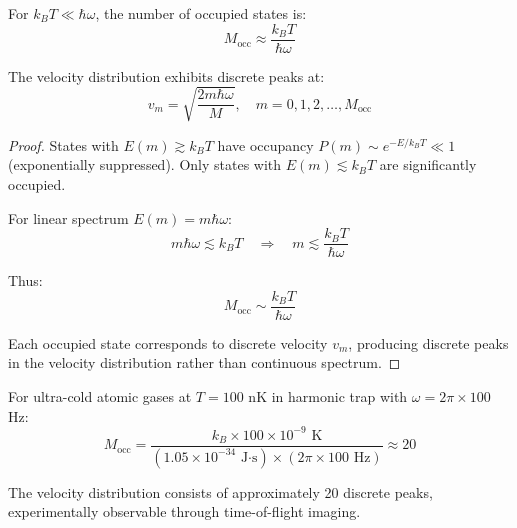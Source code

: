 \begin{definition}
\begin{proposition}
\label{prop:low_temp_quantization}
For $k_BT \ll \hbar\omega$, the number of occupied states is:
\begin{equation}
M_{\text{occ}} \approx \frac{k_BT}{\hbar\omega}
\end{equation}

The velocity distribution exhibits discrete peaks at:
\begin{equation}
v_m = \sqrt{\frac{2m\hbar\omega}{M}}, \quad m = 0, 1, 2, \ldots, M_{\text{occ}}
\end{equation}
\end{proposition}

\begin{proof}
States with $E(m) \gtrsim k_BT$ have occupancy $P(m) \sim e^{-E/k_BT} \ll 1$ (exponentially suppressed). Only states with $E(m) \lesssim k_BT$ are significantly occupied.

For linear spectrum $E(m) = m\hbar\omega$:
\begin{equation}
m\hbar\omega \lesssim k_BT \quad \Rightarrow \quad m \lesssim \frac{k_BT}{\hbar\omega}
\end{equation}

Thus:
\begin{equation}
M_{\text{occ}} \sim \frac{k_BT}{\hbar\omega}
\end{equation}

Each occupied state corresponds to discrete velocity $v_m$, producing discrete peaks in the velocity distribution rather than continuous spectrum.
\end{proof}

\begin{example}
\label{ex:ultracold_velocities}
For ultra-cold atomic gases at $T = 100$ nK in harmonic trap with $\omega = 2\pi \times 100$ Hz:
\begin{equation}
M_{\text{occ}} = \frac{k_B \times 100 \times 10^{-9} \text{ K}}{(1.05 \times 10^{-34} \text{ J·s}) \times (2\pi \times 100 \text{ Hz})} \approx 20
\end{equation}

The velocity distribution consists of approximately 20 discrete peaks, experimentally observable through time-of-flight imaging.
\end{example}


\end{definition}
